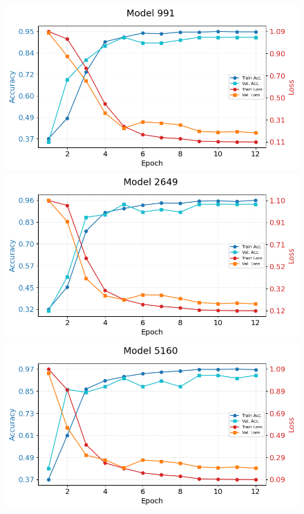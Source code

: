 \begin{figure}[ht]
    \centering
    \begin{minipage}{0.49\linewidth}
        \centering
        \includegraphics[width=\linewidth]{figures/train_metrics991.png}
 
    \end{minipage}
    \hfill
    \begin{minipage}{0.49\linewidth}
        \centering
        \includegraphics[width=\linewidth]{figures/train_metrics2649.png}

    \end{minipage}
    
    \vspace{0.5em} %



    \begin{minipage}{0.49\linewidth}
        \centering
        \includegraphics[width=\linewidth]{figures/train_metrics5160.png}


\end{minipage}
\end{figure}
